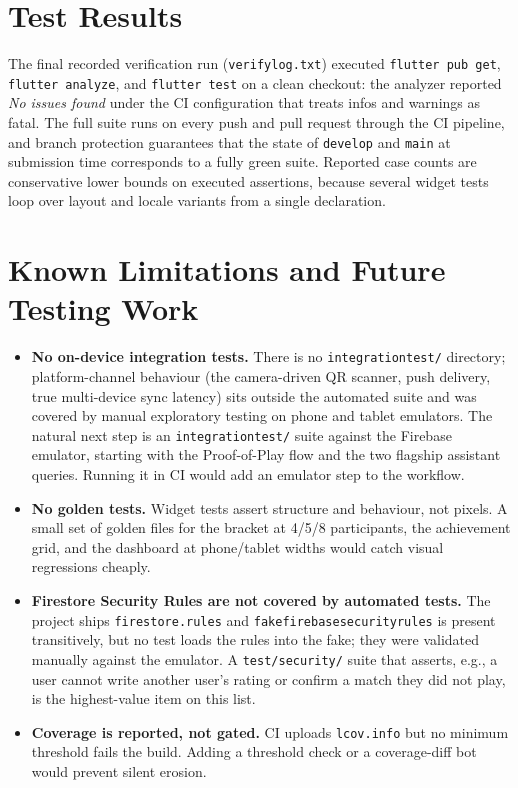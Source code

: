 \documentclass{configurations/polimi3i_thesis}
\renewcommand{\_}{\textunderscore\allowbreak}
\begin{document}
\section{Test Results}
The final recorded verification run (\texttt{verify\_log.txt}) executed \texttt{flutter pub get}, \texttt{flutter analyze}, and \texttt{flutter test} on a clean checkout: the analyzer reported \emph{No issues found} under the CI configuration that treats infos and warnings as fatal. The full suite runs on every push and pull request through the CI pipeline, and branch protection guarantees that the state of \texttt{develop} and \texttt{main} at submission time corresponds to a fully green suite. Reported case counts are conservative lower bounds on executed assertions, because several widget tests loop over layout and locale variants from a single declaration.

\section{Known Limitations and Future Testing Work}
\begin{itemize}
    \item \textbf{No on-device integration tests.} There is no \texttt{integration\_test/} directory; platform-channel behaviour (the camera-driven QR scanner, push delivery, true multi-device sync latency) sits outside the automated suite and was covered by manual exploratory testing on phone and tablet emulators. The natural next step is an \texttt{integration\_test/} suite against the Firebase emulator, starting with the Proof-of-Play flow and the two flagship assistant queries. Running it in CI would add an emulator step to the workflow.
    \item \textbf{No golden tests.} Widget tests assert structure and behaviour, not pixels. A small set of golden files for the bracket at 4/5/8 participants, the achievement grid, and the dashboard at phone/tablet widths would catch visual regressions cheaply.
    \item \textbf{Firestore Security Rules are not covered by automated tests.} The project ships \texttt{firestore.rules} and \texttt{fake\_firebase\_security\_rules} is present transitively, but no test loads the rules into the fake; they were validated manually against the emulator. A \texttt{test/security/} suite that asserts, e.g., a user cannot write another user's rating or confirm a match they did not play, is the highest-value item on this list.
    \item \textbf{Coverage is reported, not gated.} CI uploads \texttt{lcov.info} but no minimum threshold fails the build. Adding a threshold check or a coverage-diff bot would prevent silent erosion.
\end{itemize}
\end{document}
